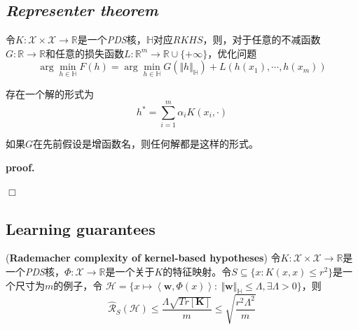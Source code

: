 \subsection*{\textsl{Representer theorem}}

\begin{mdframed}
    \begin{theorem}
        令$K:\mathcal{X}\times\mathcal{X}\rightarrow\mathbb{R}$是一个\textsl{PDS}核，$\mathbb{H}$对应$RKHS$，则，对于任意的不减函数$G:\mathbb{R}\rightarrow \mathbb{R}$和任意的损失函数$L:\mathbb{R}^m\rightarrow \mathbb{R}\cup \{+\infty\}$，优化问题
        \begin{equation}
            \arg\min_{h\in \mathbb{H}} F(h)=\arg\min_{h\in \mathbb{H}} G(\Vert h\Vert_\mathbb{H})+L(h(x_1),\cdots,h(x_m))
        \end{equation}

        存在一个解的形式为
        \begin{equation}
            h^*=\sum_{i=1}^{m}\alpha_i K(x_i,\cdot)
        \end{equation}

        如果$G$在先前假设是增函数名，则任何解都是这样的形式。
    \end{theorem}
\end{mdframed}

\textbf{proof.}\hspace{1em} 

$\Box$

\subsection*{Learning guarantees}

\begin{mdframed}
    \begin{theorem}
        (\textbf{Rademacher complexity of kernel-based hypotheses}) 令$K:\mathcal{X}\times \mathcal{X}\rightarrow \mathbb{R}$是一个\textsl{PDS}核，$\Phi:\mathcal{X}\rightarrow \mathbb{R}$是一个关于$K$的特征映射。令$S\subseteq \{x:K(x,x)\leqslant r^2\}$是一个尺寸为$m$的例子，令
        $\mathcal{H}=\{x\mapsto \left<\mathbf{w},\Phi(x)\right>:\ \Vert \mathbf{w}\Vert_{\mathbb{H}}\leqslant \Lambda,\exists \Lambda>0\}$，则
        \begin{equation}
            \hat{\mathcal{R}}_S(\mathcal{H})\leqslant \frac{\Lambda\sqrt{Tr[\mathbf{K}]}}{m}\leqslant \sqrt{\frac{r^2\Lambda^2}{m}}
        \end{equation}
    \end{theorem}
\end{mdframed}

